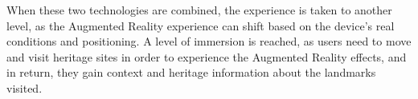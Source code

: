 When these two technologies are combined, the experience is taken to another level, as the Augmented Reality experience can shift based on the device's real conditions and positioning. 
A level of immersion is reached, as users need to move and visit heritage sites in order to experience the Augmented Reality effects, and in return, they gain context and heritage information about the landmarks visited. \\


